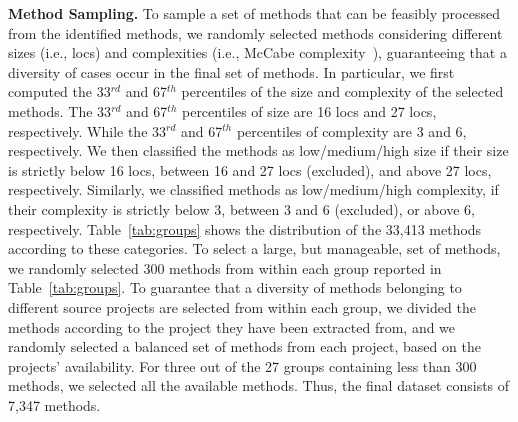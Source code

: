 \textbf{Method Sampling.} To sample a set of methods that can be feasibly processed from the identified methods, we randomly selected methods considering different sizes (i.e., locs) and complexities (i.e., McCabe complexity~\cite{cyclomatic-complexity}), guaranteeing that a diversity of cases occur in the final set of methods. In particular, we first computed the 33$^{rd}$ and 67$^{th}$ percentiles of the size and complexity of the selected methods. The 33$^{rd}$ and 67$^{th}$ percentiles of size are 16 locs and 27 locs, respectively. While the 33$^{rd}$ and 67$^{th}$ percentiles of complexity are 3 and 6, respectively. We then classified the methods as low/medium/high size if their size is strictly below 16 locs, between 16 and 27 locs (excluded), and above 27 locs, respectively. Similarly, we classified methods as low/medium/high complexity, if their complexity is strictly below 3, between 3 and 6 (excluded), or above 6, respectively. Table~\ref{tab:groups} shows the distribution of the 33,413 methods according to these categories.
To select a large, but manageable, set of methods, we randomly selected 300 methods from within each group reported in Table~\ref{tab:groups}. To guarantee that a diversity of methods belonging to different source projects are selected from within each group, we divided the methods according to the project they have been extracted from, and we randomly selected a balanced set of methods from each project, based on the projects' availability. 
For three out of the 27 groups containing less than 300 methods, we selected all the available methods. 
Thus, the final dataset %
consists of 7,347 methods.

